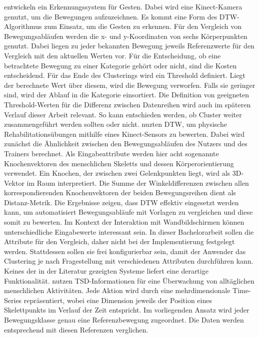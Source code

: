 \citet{wahyuni_motion_2021} entwickeln ein Erkennungssystem für Gesten.
Dabei wird eine Kinect-Kamera genutzt, um die Bewegungen aufzuzeichnen.
Es kommt eine Form des \ac{DTW}-Algorithmus zum Einsatz, um die Gesten zu erkennen.
Für den Vergleich von Bewegungsabläufen werden die x- und y-Koordinaten von sechs Körperpunkten genutzt.
Dabei liegen zu jeder bekannten Bewegung jeweils Referenzwerte für den Vergleich mit den aktuellen Werten vor.
Für die Entscheidung, ob eine betrachtete Bewegung zu einer Kategorie gehört oder nicht, sind die Kosten entscheidend.
Für das Ende des Clusterings wird ein Threshold definiert.
Liegt der berechnete Wert über diesem, wird die Bewegung verworfen.
Falls sie geringer sind, wird der Ablauf in die Kategorie einsortiert.
Die Definition von geeigneten Threshold-Werten für die Differenz zwischen Datenreihen
wird auch im späteren Verlauf dieser Arbeit relevant.
So kann entschieden werden, ob Cluster weiter zusammengeführt werden sollten oder nicht.
\citet{yu_dynamic_2019} nuzten \ac{DTW}, um physische Rehabilitationsübungen mithilfe eines Kinect-Sensors zu bewerten.
Dabei wird zunächst die Ähnlichkeit zwischen den Bewegungsabläufen des Nutzers und des Trainers berechnet.
Als Eingabeattribute werden hier acht sogenannte Knochenvektoren des menschlichen Skeletts und dessen Körperorientierung verwendet.
Ein Knochen, der zwischen zwei Gelenkpunkten liegt, wird als 3D-Vektor im Raum interpretiert.
Die Summe der Winkeldifferenzen zwischen allen korrespondierenden Knochenvektoren der beiden Bewegungsreihen dient
als Distanz-Metrik.
Die Ergebnisse zeigen, dass \ac{DTW} effektiv eingesetzt werden kann,
um automatisiert Bewegungsabläufe mit Vorlagen zu vergleichen und diese somit zu bewerten.
Im Kontext der Interaktion mit Wandbildschirmen können unterschiedliche Eingabewerte interessant sein.
In dieser Bachelorarbeit sollen die Attribute für den Vergleich, daher nicht bei der Implementierung festgelegt werden.
Stattdessen sollen sie frei konfigurierbar sein,
damit der Anwender das Clustering je nach Fragestellung mit verschiedenen Attributen durchführen kann.
Keines der in der Literatur gezeigten Systeme liefert eine derartige Funktionalität.
\citet{mohammadzade_dynamic_2021} nutzen \ac{TSD}-Informationen für eine Überwachung von alltäglichen menschlichen Aktivitäten.
Jede Aktion wird durch eine mehrdimensionale Time-Series repräsentiert,
wobei eine Dimension jeweils der Position eines Skelettpunkts im Verlauf der Zeit entspricht.
Im vorliegenden Ansatz wird jeder Bewegungsklasse genau eine Referenzbewegung zugeordnet.
Die Daten werden entsprechend mit diesen Referenzen verglichen.
